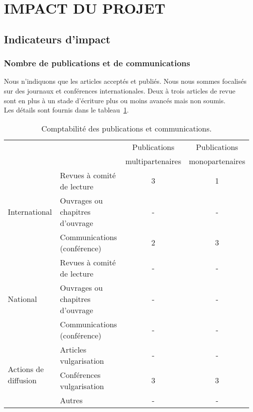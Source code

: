\section{IMPACT DU PROJET}
\label{sec:impact}

\subsection{Indicateurs d’impact}
\subsubsection*{Nombre de publications et de communications}
Nous n'indiquons que les articles acceptés et publiés. Nous nous sommes focalisés sur des journaux et conférences internationales. Deux à trois articles de revue sont en plus à un stade d'écriture plus ou moins avancés mais non soumis.\\
Les détails sont fournis dans le tableau~\ref{tab:publis}.

\begin{table}[h!]
\small
    \centering
    \begin{tabular}{|p{3.2cm}|p{4.35cm}|c|c|}
    \hline
&  & Publications & Publications\\
 & &multipartenaires & monopartenaires \\
\hline

\multirow{3}{*}{International}&Revues à comité de lecture& 3&1\\\cline{2-4}
&Ouvrages ou chapitres d’ouvrage& -&-\\\cline{2-4}
&Communications (conférence)&2&3\\\hline
\multirow{3}{*}{National}&Revues à comité de lecture&-&-\\\cline{2-4}
&Ouvrages ou chapitres d’ouvrage&-&-\\\cline{2-4}
&Communications (conférence)&-&-\\\hline
\multirow{3}{*}{Actions de diffusion}&Articles vulgarisation&-&-\\\cline{2-4}
&Conférences vulgarisation&3&3\\\cline{2-4}
&Autres&-&-\\
\hline
    \end{tabular}

        \caption{Comptabilité des publications et communications.    \label{tab:publis}}

\end{table}


